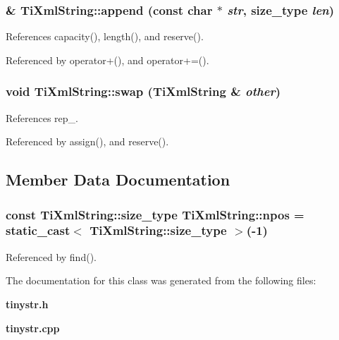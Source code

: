 \subsubsection[append]{ \& TiXmlString::append (const char $\ast$ {\em str}, \/  {\bf size\_\-type} {\em len})}\label{classTiXmlString_d44b21700d2ec24a511367b222b643fb}




References capacity(), length(), and reserve().

Referenced by operator+(), and operator+=().
\subsubsection[swap]{\setlength{\rightskip}{0pt plus 5cm}void TiXmlString::swap ({\bf TiXmlString} \& {\em other})\hspace{0.3cm}{\tt  [inline]}}\label{classTiXmlString_a392cbc180752a79f007f4f9280c7762}




References rep\_\-.

Referenced by assign(), and reserve().

\subsection{Member Data Documentation}
\subsubsection[npos]{\setlength{\rightskip}{0pt plus 5cm}const {\bf TiXmlString::size\_\-type} {\bf TiXmlString::npos} = static\_\-cast$<$ {\bf TiXmlString::size\_\-type} $>$(-1)\hspace{0.3cm}{\tt  [static]}}\label{classTiXmlString_8f4422d227088dc7bec96f479b275d0a}




Referenced by find().

The documentation for this class was generated from the following files:\begin{CompactItemize}
\item 
{\bf tinystr.h}\item 
{\bf tinystr.cpp}\end{CompactItemize}
